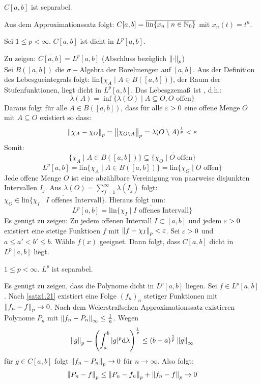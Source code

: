 \begin{korollar}
$ C[a,b] $ ist separabel.
\end{korollar}
\begin{beweis}
	Aus dem Approximationssatz folgt: $ C[a,b]=\overline{\text{lin}\lbrace x_n\mid n\in\mathbb{N}_0\rbrace} $ mit $ x_n(t)=t^n $.
\end{beweis}
\begin{satz}
	Sei $ 1\leq p<\infty $. $ C[a,b] $ ist dicht in $ L^p[a,b] $.
\end{satz}
\begin{beweis}
	Zu zeigen: $ \overline{C[a,b]}=L^p[a,b] $ (Abschluss bez\"uglich $ \left\|\cdot\right\|_p $)\\
	Sei $ B([a,b]) $ die $ \sigma- $Algebra der Borelmengen auf $ [a,b] $. Aus der Definition des Lebesgueintegrals folgt: $ \text{lin}\lbrace\chi_A\mid A\in B([a,b])\rbrace $, der Raum der Stufenfunktionen, liegt dicht in $ L^p[a,b] $. Das Lebesgzema\ss\ ist , d.h.:
	\[ \lambda(A)=\inf\lbrace\lambda(O)\mid A\subseteq O, O\text{ offen}\rbrace  \]
	Daraus folgt f\"ur alle $ A\in B([a,b]) $, dass f\"ur alle $ \varepsilon>0 $ eine offene Menge $ O $ mit $ A\subseteq O $ existiert so dass:
	\[ \left\|\chi_A-\chi_O\right\|_p=\left\|\chi_{O\setminus A}\right\|_p=\lambda(O\setminus A)^\frac{1}{p}<\varepsilon \]
	Somit:
	\[ \lbrace\chi_A\mid A\in B([a,b])\rbrace\subseteq\overline{\lbrace\chi_O\mid O\text{ offen}\rbrace} \]
	\[ L^p[a,b]=\overline{\text{lin}\lbrace\chi_A\mid A\in B([a,b])\rbrace}=\overline{\text{lin}\lbrace\chi_O\mid O\text{ offen}\rbrace} \]
	Jede offene Menge $ O $ ist eine abz\"ahlbare Vereinigung von paarweise disjunkten Intervallen $ I_j $. Aus $ \lambda(O)=\sum_{j=1}^{\infty}\lambda(I_j) $ folgt:
	$\chi_O\in\overline{\text{lin}\lbrace\chi_I\mid I\text{ offenes Intervall}\rbrace}$. Hieraus folgt nun: \[ L^p[a,b]=\overline{\text{lin}\lbrace\chi_I\mid I\text{ offenes Intervall}\rbrace} \]
	Es gen\"ugt zu zeigen: Zu jedem offenen Intervall $ I\subset[a,b] $ und jedem $ \varepsilon>0 $ existiert eine stetige Funktioen $ f $ mit $ \left\|f-\chi_I\right\|_p<\varepsilon $. Sei $ \varepsilon>0 $ und $ a\leq a'<b'\leq b $. W\"ahle $ f(x) $ geeignet. Dann folgt, dass $ C[a,b] $ dicht in $ L^p[a,b] $ liegt.
\end{beweis}
\begin{korollar}
	$ 1\leq p<\infty $. $ L^p $ ist separabel.
\end{korollar}
\begin{beweis}
	Es gen\"ugt zu zeigen, dass die Polynome dicht in $ L^p[a,b] $ liegen. Sei $ f\in L^p[a,b] $. Nach \ref{satz1.21} existiert eine Folge $ (f_n)_n $ stetiger Funktionen mit $ \left\|f_n-f\right\|_p\rightarrow 0 $. Nach dem Weierstra\ss schen Approximationssatz existieren Polynome $ P_n $ mit $ \left\|f_n-P_n\right\|_\infty\leq\frac{1}{n} $. Wegen
	\[ \left\|g\right\|_p=\left(\int_a^b |g|^p\mathrm d\lambda\right)^\frac{1}{p}\leq(b-a)^\frac{1}{p}\left\|g\right\|_\infty \]
	f\"ur $ g\in C[a,b] $ folgt $ \left\|f_n-P_n\right\|_p\rightarrow 0 $ f\"ur $ n\rightarrow\infty $. Also folgt:
	\[ \left\|P_n-f\right\|_p\leq\left\|P_n-f_n\right\|_p+\left\|f_n-f\right\|_p\rightarrow 0 \]
\end{beweis}
